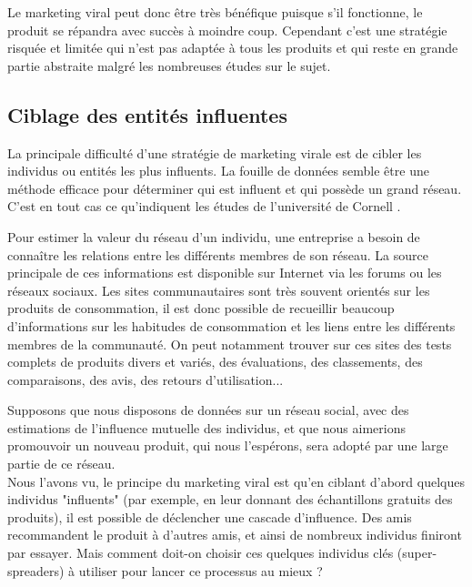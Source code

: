 Le marketing viral peut donc être très bénéfique puisque s'il fonctionne, le produit se répandra avec succès à moindre coup. Cependant c'est une stratégie risquée et limitée qui n'est pas adaptée à tous les produits et qui reste en grande partie abstraite malgré les nombreuses études sur le sujet.


\subsection{Ciblage des entités influentes}

La principale difficulté d'une stratégie de marketing virale est de cibler les individus ou entités les plus influents. La fouille de données semble être une méthode efficace pour déterminer qui est influent et qui possède un grand réseau. C'est en tout cas ce qu'indiquent les études de l'université de Cornell \cite{kdd03}.

Pour estimer la valeur du réseau d'un individu, une entreprise a besoin de connaître les relations entre les différents membres de son réseau. La source principale de ces informations est disponible sur Internet via les forums ou les réseaux sociaux. Les sites communautaires sont très souvent orientés sur les produits de consommation, il est donc possible de recueillir beaucoup d'informations sur les habitudes de consommation et les liens entre les différents membres de la communauté. On peut notamment trouver sur ces sites des tests complets de produits divers et variés, des évaluations, des classements, des comparaisons, des avis, des retours d'utilisation...

Supposons que nous disposons de données sur un réseau social, avec des estimations de l'influence mutuelle des individus, et que nous aimerions promouvoir un nouveau produit, qui nous l'espérons, sera adopté par une large partie de ce réseau.\\
Nous l'avons vu, le principe du marketing viral est qu'en ciblant d'abord quelques individus "influents" (par exemple, en leur donnant des échantillons gratuits des produits), il est possible de déclencher une cascade d'influence. Des amis recommandent le produit à d'autres amis, et ainsi de nombreux individus finiront par essayer. Mais comment doit-on choisir ces quelques individus clés (super-spreaders) à utiliser pour lancer ce processus au mieux ?


